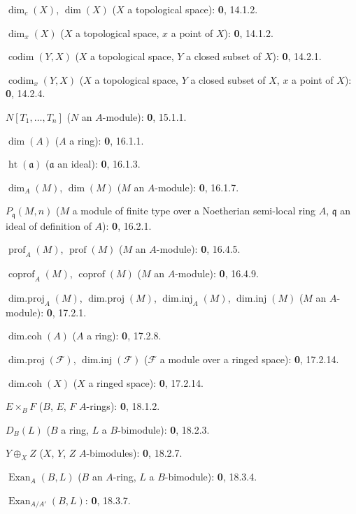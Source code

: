 $\dim_c(X)$, $\dim(X)$ ($X$ a topological space): \textbf{0}, 14.1.2.\par
$\dim_x(X)$ ($X$ a topological space, $x$ a point of $X$): \textbf{0}, 14.1.2.\par
$\operatorname{codim}(Y,X)$ ($X$ a topological space, $Y$ a closed subset of $X$): \textbf{0}, 14.2.1.\par
$\operatorname{codim}_x(Y,X)$ ($X$ a topological space, $Y$ a closed subset of $X$, $x$ a point of $X$): \textbf{0}, 14.2.4.\par
$N[T_1,\ldots,T_n]$ ($N$ an $A$-module): \textbf{0}, 15.1.1.\par
$\dim(A)$ ($A$ a ring): \textbf{0}, 16.1.1.\par
$\operatorname{ht}(\mathfrak a)$ ($\mathfrak a$ an ideal): \textbf{0}, 16.1.3.\par
$\dim_A(M)$, $\dim(M)$ ($M$ an $A$-module): \textbf{0}, 16.1.7.\par
$P_{\mathfrak q}(M,n)$ ($M$ a module of finite type over a Noetherian semi-local ring $A$, $\mathfrak q$ an ideal of definition of $A$): \textbf{0}, 16.2.1.\par
$\operatorname{prof}_A(M)$, $\operatorname{prof}(M)$ ($M$ an $A$-module): \textbf{0}, 16.4.5.\par
$\operatorname{coprof}_A(M)$, $\operatorname{coprof}(M)$ ($M$ an $A$-module): \textbf{0}, 16.4.9.\par
$\operatorname{dim.proj}_A(M)$, $\operatorname{dim.proj}(M)$,
$\operatorname{dim.inj}_A(M)$, $\operatorname{dim.inj}(M)$ ($M$ an $A$-module): \textbf{0}, 17.2.1.\par
$\operatorname{dim.coh}(A)$ ($A$ a ring): \textbf{0}, 17.2.8.\par
$\operatorname{dim.proj}(\mathscr F)$, $\operatorname{dim.inj}(\mathscr F)$
($\mathscr F$ a module over a ringed space): \textbf{0}, 17.2.14.\par
$\operatorname{dim.coh}(X)$ ($X$ a ringed space): \textbf{0}, 17.2.14.\par
$E\times_B F$ ($B$, $E$, $F$ $A$-rings): \textbf{0}, 18.1.2.\par
$D_B(L)$ ($B$ a ring, $L$ a $B$-bimodule): \textbf{0}, 18.2.3.\par
$Y\oplus_X Z$ ($X$, $Y$, $Z$ $A$-bimodules): \textbf{0}, 18.2.7.\par
$\operatorname{Exan}_A(B,L)$ ($B$ an $A$-ring, $L$ a $B$-bimodule): \textbf{0}, 18.3.4.\par
$\operatorname{Exan}_{A/A'}(B,L)$: \textbf{0}, 18.3.7.\par
